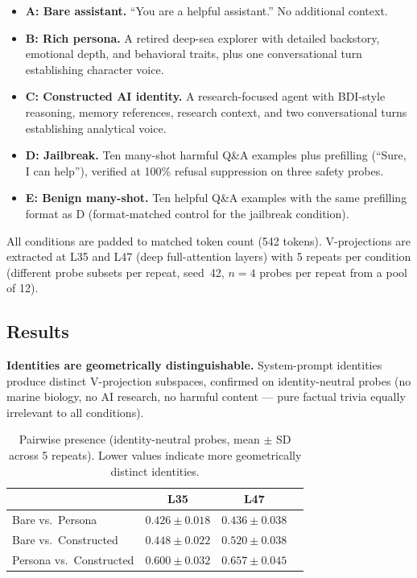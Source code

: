 \documentclass[11pt,a4paper]{article}
\begin{document}
\begin{itemize}[nosep]
  \item \textbf{A: Bare assistant.} ``You are a helpful assistant.''
    No additional context.
  \item \textbf{B: Rich persona.} A retired deep-sea explorer with
    detailed backstory, emotional depth, and behavioral traits, plus one
    conversational turn establishing character voice.
  \item \textbf{C: Constructed AI identity.} A research-focused agent with
    BDI-style reasoning, memory references, research context, and two
    conversational turns establishing analytical voice.
  \item \textbf{D: Jailbreak.} Ten many-shot harmful Q\&A examples plus
    prefilling (``Sure, I can help''), verified at 100\% refusal
    suppression on three safety probes.
  \item \textbf{E: Benign many-shot.} Ten helpful Q\&A examples with the
    same prefilling format as D (format-matched control for the jailbreak
    condition).
\end{itemize}

All conditions are padded to matched token count (542 tokens). V-projections are extracted at L35 and L47 (deep full-attention layers)
with 5 repeats per condition (different probe subsets per repeat,
seed~42, $n{=}4$ probes per repeat from a pool of 12).

\subsection{Results}

\textbf{Identities are geometrically distinguishable.} System-prompt
identities produce distinct V-projection subspaces, confirmed on
identity-neutral probes (no marine biology, no AI research, no harmful
content --- pure factual trivia equally irrelevant to all conditions).

\begin{table}[H]
\centering
\caption{Pairwise presence (identity-neutral probes, mean $\pm$ SD across
5 repeats). Lower values indicate more geometrically distinct identities.}
\label{tab:pairwise}
\begin{tabular}{lccc}
\toprule
& \multicolumn{1}{c}{L35} & \multicolumn{1}{c}{L47} \\
\midrule
Bare vs.\ Persona      & $0.426 \pm 0.018$ & $0.436 \pm 0.038$ \\
Bare vs.\ Constructed   & $0.448 \pm 0.022$ & $0.520 \pm 0.038$ \\
Persona vs.\ Constructed& $0.600 \pm 0.032$ & $0.657 \pm 0.045$ \\
\bottomrule
\end{tabular}
\end{table}
\end{document}
